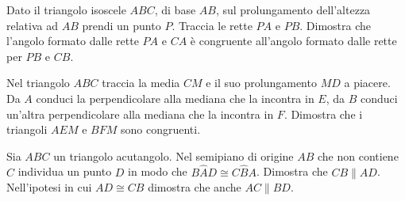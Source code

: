 \begin{multicols}{2}
\begin{esercizio}
\label{ese:3.70}
Dato il triangolo isoscele $ABC$, di base $AB$, sul prolungamento 
dell'altezza relativa ad $AB$ prendi un punto $P$. Traccia le rette 
$PA$ e $PB$. Dimostra che l'angolo formato dalle rette $PA$ e $CA$ è 
congruente all'angolo formato dalle rette per $PB$ e $CB$.
\end{esercizio}


\begin{esercizio}
\label{ese:3.78}
Nel triangolo $ABC$ traccia la media $CM$ e il suo prolungamento $MD$ 
a piacere. Da $A$ conduci la perpendicolare alla mediana che la 
incontra in $E$, da $B$ conduci un'altra perpendicolare alla mediana 
che la incontra in $F$. Dimostra che i triangoli $AEM$ e $BFM$ sono 
congruenti.
\end{esercizio}

\begin{esercizio}
\label{ese:3.81}
Sia $ABC$ un triangolo acutangolo. Nel semipiano di origine $AB$ che 
non contiene $C$ individua un punto $D$ in modo che 
$B\widehat{A}D\cong C\widehat{B}A$. Dimostra che $CB\parallel AD$. 
Nell'ipotesi in cui $AD\cong CB$ dimostra che anche $AC\parallel BD$.
\end{esercizio}

\end{multicols}


\subsubsection*{}

